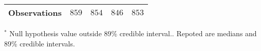 \begin{table}[h]
\begin{center}
\begin{threeparttable}
\begin{tabular}{l c c c c}
\hline
Observations                                           & $859$            & $854$             & $846$            & $853$             \\
\hline
\end{tabular}
\begin{tablenotes}[flushleft]
\scriptsize{$^*$ Null hypothesis value outside 89\% credible interval.. Repoted are medians and 89\% credible intervals.}
\end{tablenotes}
\end{threeparttable}
\label{table:ol-polint-la-pol-872}
\end{center}
\end{table}
